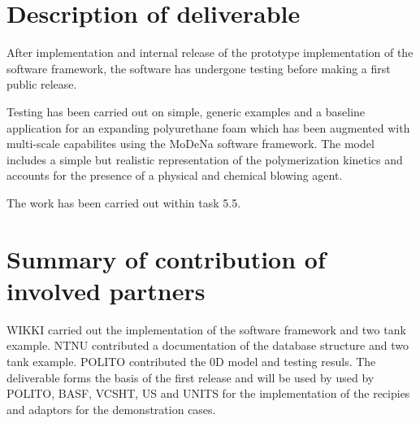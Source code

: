 %
\section{Description of deliverable}

After implementation and internal release of the prototype implementation of the
software framework, the software has undergone testing before making a first
public release.

Testing has been carried out on simple, generic examples and a baseline
application for an expanding polyurethane foam which has been augmented with
multi-scale capabilites using the MoDeNa software framework. The model includes
a simple but realistic representation of the polymerization kinetics and
accounts for the presence of a physical and chemical blowing agent.

The work has been carried out within task 5.5.


\section{Summary of contribution of involved partners}
%
WIKKI carried out the implementation of the software framework and two tank
example. NTNU contributed a documentation of the database structure and two tank
example.  POLITO contributed the 0D model and testing resuls. The deliverable
forms the basis of the first release and will be used by used by POLITO, BASF,
VCSHT, US and UNITS for the implementation of the recipies and adaptors for the
demonstration cases.

